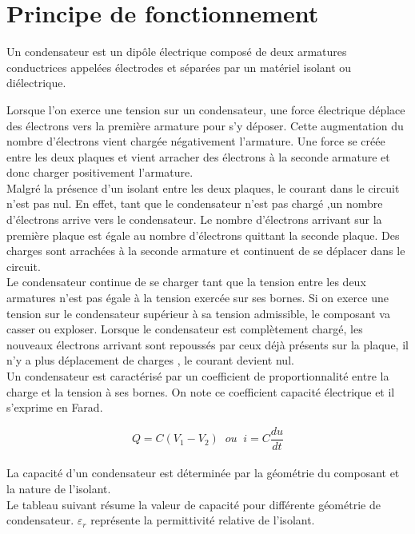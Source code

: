 
\chapter{Principe de fonctionnement}

Un condensateur est un dipôle électrique composé de deux armatures conductrices appelées électrodes et séparées par un matériel isolant ou diélectrique.


Lorsque l'on exerce une tension sur un condensateur, une force électrique déplace des électrons vers la première armature pour s'y déposer. Cette augmentation du nombre d'électrons vient chargée négativement l'armature. Une force se créée entre les deux plaques et vient arracher des électrons à la seconde armature et donc charger positivement l'armature. \\ 

Malgré la présence d'un isolant entre les deux plaques, le courant dans le circuit n'est pas nul. En effet, tant que le condensateur n'est pas chargé ,un nombre d'électrons arrive vers le condensateur. Le nombre d'électrons arrivant sur la première plaque est égale au nombre d'électrons quittant la seconde plaque. Des charges sont arrachées à la seconde armature et continuent de se déplacer dans le circuit.  \\ 

Le condensateur continue de se charger tant que la tension entre les deux armatures n'est pas égale à la tension exercée sur ses bornes. Si on exerce une tension sur le condensateur supérieur à sa tension admissible, le composant va casser ou exploser. Lorsque le condensateur est complètement chargé, les nouveaux électrons arrivant sont repoussés par ceux déjà présents sur la plaque, il n'y a plus déplacement de charges , le courant devient nul. \\

Un condensateur est caractérisé par un coefficient de proportionnalité entre la charge et la tension à ses bornes. On note ce coefficient capacité électrique et il s'exprime en Farad.

$$ Q = C(V_1 - V_2) \;\; ou \;\; i = C \frac{du}{dt}$$ \\

La capacité d'un condensateur est déterminée par la géométrie du composant et la nature de l'isolant. \\

Le tableau suivant résume la valeur de capacité pour différente géométrie de condensateur. $ \varepsilon_r $ représente la permittivité relative de l'isolant.\\



